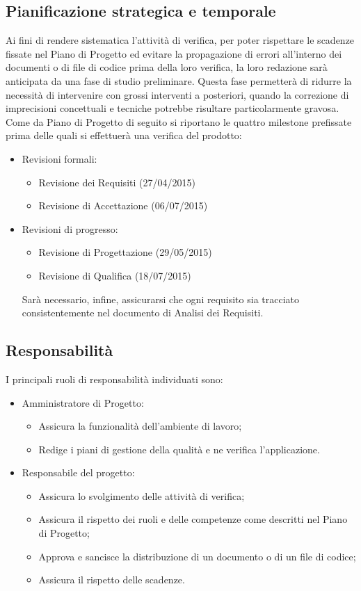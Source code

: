 \subsection{Pianificazione strategica e temporale}

Ai fini di rendere sistematica l'attività di verifica, per poter rispettare le scadenze fissate nel Piano di Progetto ed evitare la propagazione di errori all'interno dei documenti o di file di codice prima della loro verifica, la loro redazione sarà anticipata da una fase di studio preliminare.
Questa fase permetterà di ridurre la necessità di intervenire con grossi interventi a posteriori, quando la correzione di imprecisioni concettuali e tecniche potrebbe risultare particolarmente gravosa.
Come da Piano di Progetto di seguito si riportano le quattro milestone prefissate prima delle quali si effettuerà una verifica del prodotto:
\begin{itemize}

\item Revisioni formali:
\begin{itemize}
\item Revisione dei Requisiti (27/04/2015)
\item Revisione di Accettazione (06/07/2015)
\end{itemize}

\item Revisioni di progresso:
\begin{itemize}
\item Revisione di Progettazione (29/05/2015)
\item Revisione di Qualifica (18/07/2015)
\end{itemize}
Sarà necessario, infine, assicurarsi che ogni requisito sia tracciato consistentemente nel documento di Analisi dei Requisiti.
\end{itemize}
\subsection{Responsabilità}

I principali ruoli di responsabilità individuati sono:
\begin{itemize}
\item Amministratore di Progetto:
\begin{itemize}
\item Assicura la funzionalità dell'ambiente di lavoro;
\item Redige i piani di gestione della qualità e ne verifica l'applicazione.
\end{itemize}

\item Responsabile del progetto:
\begin{itemize}
\item Assicura lo svolgimento delle attività di verifica;
\item Assicura il rispetto dei ruoli e delle competenze come descritti nel Piano di Progetto;
\item Approva e sancisce la distribuzione di un documento o di un file di codice;
\item Assicura il rispetto delle scadenze.
\end{itemize}
\end{itemize}


